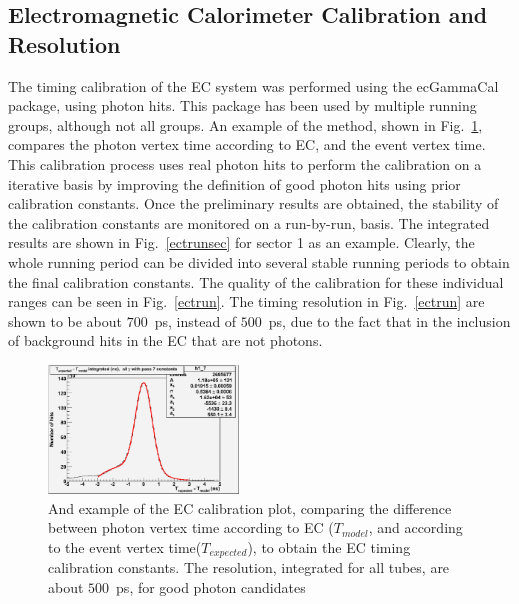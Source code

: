 \subsection{\label{sec:calib.ec}Electromagnetic Calorimeter Calibration and Resolution}
The timing calibration of the EC system was performed using the ecGammaCal package, using photon hits. This package has been used by multiple running groups, although not all groups. An example of the method, shown in Fig.~\ref{ectall}, compares the photon vertex time according to EC, and the event vertex time. This calibration process uses real photon hits to perform the calibration on a iterative basis by improving the definition of good photon hits using prior calibration constants. Once the preliminary results are obtained, the stability of the calibration constants are monitored on a run-by-run, basis. The integrated results are  shown in Fig.~\ref{ectrunsec} for sector 1 as an example. Clearly, the whole running period can be divided into several stable running periods to obtain the final calibration constants. The quality of the calibration for these individual ranges can be seen in Fig.~\ref{ectrun}. The timing resolution in Fig.~\ref{ectrun} are shown to be about $700$~ps, instead of $500$~ps, due to the fact that in the inclusion of background hits in the EC that are not photons.

\begin{figure}[h]
\begin{center}
 \includegraphics[width=0.45\textwidth]{figures/calib/ec/ec_vtimeall.eps}
  \caption{And example of the EC calibration plot, comparing  the difference between photon vertex time according to EC ($T_{model}$, and according to the event vertex time($T_{expected}$), to obtain the EC timing calibration constants. The resolution, integrated for all tubes, are about $500$~ps, for good photon candidates}
  \label{ectall}
  \end{center}
\end{figure}


